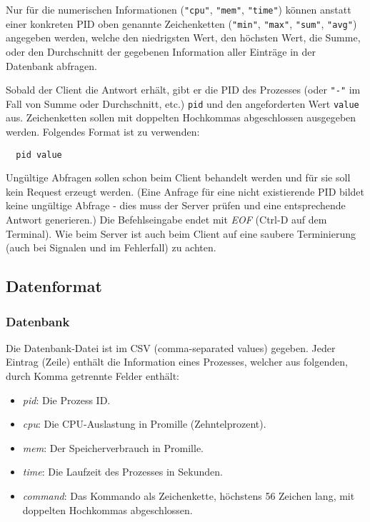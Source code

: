 Nur für die numerischen Informationen (\texttt{"{}cpu"{}}, \texttt{"{}mem"{}},
\texttt{"{}time"{}}) können anstatt einer konkreten PID oben genannte
Zeichenketten (\texttt{"{}min"}, \texttt{"{}max"}, \texttt{"{}sum"},
\texttt{"{}avg"}) angegeben werden, welche den niedrigsten Wert, den höchsten
Wert, die Summe, oder den Durchschnitt der gegebenen Information aller Einträge
in der Datenbank abfragen.

Sobald der Client die Antwort erhält, gibt er die PID des Prozesses (oder
\texttt{"{}-"{}} im Fall von Summe oder Durchschnitt, etc.) \texttt{pid} und
den angeforderten Wert \texttt{value} aus. Zeichenketten sollen mit doppelten
Hochkommas abgeschlossen ausgegeben werden. Folgendes Format ist zu verwenden:
\begin{verbatim}
  pid value
\end{verbatim}

%
Ungültige Abfragen sollen schon beim Client behandelt werden und für sie
soll kein Request erzeugt werden.
(Eine Anfrage für eine nicht existierende PID bildet keine ungültige Abfrage
- dies muss der Server prüfen und eine entsprechende Antwort generieren.)
%
Die Befehlseingabe endet mit \emph{EOF} (Ctrl-D auf dem Terminal).
Wie beim Server ist auch beim Client auf eine saubere Terminierung (auch bei
Signalen und im Fehlerfall) zu achten.



\subsection*{Datenformat}

\subsubsection*{Datenbank}

Die Datenbank-Datei ist im CSV (comma-separated values) gegeben.
Jeder Eintrag (Zeile) enthält die Information eines Prozesses, welcher
aus folgenden, durch Komma getrennte Felder enthält:

\begin{itemize}
  \item \emph{pid}: Die Prozess ID.
  \item \emph{cpu}: Die CPU-Auslastung in Promille (Zehntelprozent).
  \item \emph{mem}: Der Speicherverbrauch in Promille.
  \item \emph{time}: Die Laufzeit des Prozesses in Sekunden.
  \item \emph{command}: Das Kommando als Zeichenkette, höchstens 56
    Zeichen lang, mit doppelten Hochkommas abgeschlossen.
\end{itemize}

